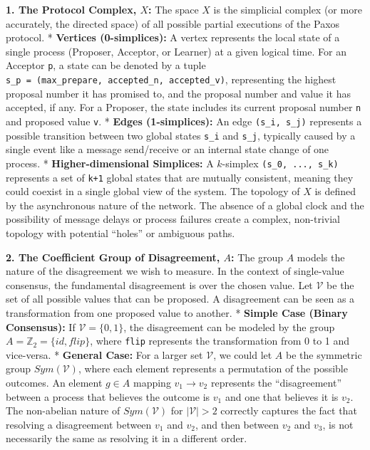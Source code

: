 \documentclass[
]{article}
\begin{document}
\textbf{1. The Protocol Complex, \(X\):} The space \(X\) is the
simplicial complex (or more accurately, the directed space) of all
possible partial executions of the Paxos protocol. * \textbf{Vertices
(0-simplices):} A vertex represents the local state of a single process
(Proposer, Acceptor, or Learner) at a given logical time. For an
Acceptor \texttt{p}, a state can be denoted by a tuple
\texttt{s\_p\ =\ (max\_prepare,\ accepted\_n,\ accepted\_v)},
representing the highest proposal number it has promised to, and the
proposal number and value it has accepted, if any. For a Proposer, the
state includes its current proposal number \texttt{n} and proposed value
\texttt{v}. * \textbf{Edges (1-simplices):} An edge
\texttt{(s\_i,\ s\_j)} represents a possible transition between two
global states \texttt{s\_i} and \texttt{s\_j}, typically caused by a
single event like a message send/receive or an internal state change of
one process. * \textbf{Higher-dimensional Simplices:} A \(k\)-simplex
\texttt{(s\_0,\ ...,\ s\_k)} represents a set of \texttt{k+1} global
states that are mutually consistent, meaning they could coexist in a
single global view of the system. The topology of \(X\) is defined by
the asynchronous nature of the network. The absence of a global clock
and the possibility of message delays or process failures create a
complex, non-trivial topology with potential ``holes'' or ambiguous
paths.

\textbf{2. The Coefficient Group of Disagreement, \(A\):} The group
\(A\) models the nature of the disagreement we wish to measure. In the
context of single-value consensus, the fundamental disagreement is over
the chosen value. Let \(\mathcal{V}\) be the set of all possible values
that can be proposed. A disagreement can be seen as a transformation
from one proposed value to another. * \textbf{Simple Case (Binary
Consensus):} If \(\mathcal{V} = \{0, 1\}\), the disagreement can be
modeled by the group \(A = \mathbb{Z}_2 = \{id, flip\}\), where
\texttt{flip} represents the transformation from 0 to 1 and vice-versa.
* \textbf{General Case:} For a larger set \(\mathcal{V}\), we could let
\(A\) be the symmetric group \(Sym(\mathcal{V})\), where each element
represents a permutation of the possible outcomes. An element
\(g \in A\) mapping \(v_1 \to v_2\) represents the ``disagreement''
between a process that believes the outcome is \(v_1\) and one that
believes it is \(v_2\). The non-abelian nature of \(Sym(\mathcal{V})\)
for \(|\mathcal{V}| > 2\) correctly captures the fact that resolving a
disagreement between \(v_1\) and \(v_2\), and then between \(v_2\) and
\(v_3\), is not necessarily the same as resolving it in a different
order.
\end{document}
